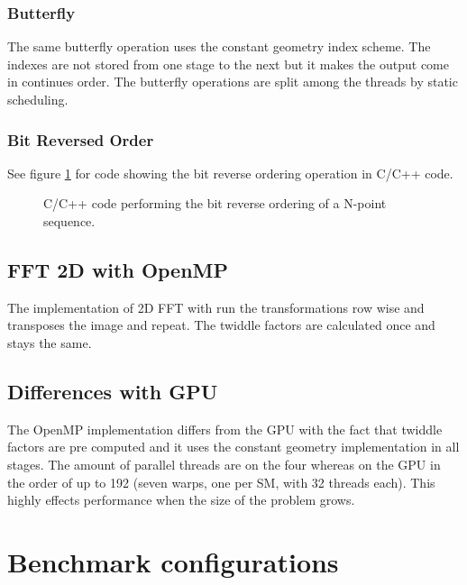 \subsubsection{Butterfly}

The same butterfly operation uses the constant geometry index scheme. The indexes are not stored from one stage to the next but it makes the output come in continues order. The butterfly operations are split among the threads by static scheduling.

\subsubsection{Bit Reversed Order}

See figure \ref{fig:omp:bit-reverse-order} for code showing the bit reverse ordering operation in C/C++ code.

\begin{figure}
	\centering
	\begin{framed}
			
	\end{framed}
	\caption{ C/C++ code performing the bit reverse ordering of a N-point sequence. }
	\label{fig:omp:bit-reverse-order}
\end{figure}

\subsection{FFT 2D with OpenMP}

The implementation of \gls{2D} \gls{FFT} with {\OMP} run the transformations row wise and transposes the image and repeat. The twiddle factors are calculated once and stays the same.

\subsection{Differences with GPU}

The OpenMP implementation differs from the \gls{GPU} with the fact that twiddle factors are pre computed and it uses the constant geometry implementation in all stages. The amount of parallel threads are on the {\INTELCPU} four whereas on the \gls{GPU} in the order of up to 192 (seven warps, one per \gls{SM}, with 32 threads each). This highly effects performance when the size of the problem grows.

\section{Benchmark configurations}

